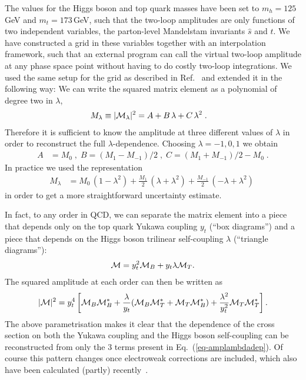 The values for the Higgs boson and top quark masses have been set to
$m_h=125$\,GeV and $m_t=173$\,GeV, such that the two-loop amplitudes
are only functions of two independent variables, the parton-level Mandelstam invariants
$\hat{s}$ and $\hat{t}$.  We have constructed a grid in these
variables together with an interpolation framework, such that an
external program can call the virtual two-loop amplitude at any phase space
point without having to do costly two-loop integrations.
We used the same setup for the grid as described in Ref.~\cite{Heinrich:2017kxx} and extended it in the following way:
We can write the squared matrix element as a polynomial of degree two in $\lambda$, 
\begin{align}
M_\lambda& \equiv |{\cal M}_\lambda|^2=A+B\,\lambda + C\,\lambda^2\;. \label{eq-amplambdadep}
\end{align}
Therefore it is sufficient to know the amplitude at three different values of $\lambda$ in order to reconstruct the full $\lambda$-dependence. 
Choosing $\lambda=-1,0,1$ we obtain
\begin{align}
A&=M_0\;,\; B=(M_1-M_{-1})/2\;,\; C=(M_1+M_{-1})/2-M_0\;.
\end{align}
In practice we used the representation 
\begin{align}
M_\lambda &=M_0\,(1-\lambda^2)+\frac{M_1}{2}\,(\lambda+\lambda^2) + \frac{M_{-1}}{2}\,(-\lambda+\lambda^2)\;
\end{align}
in order to get a more straightforward uncertainty estimate.

In fact, to any order in QCD,  we can separate the matrix element into a 
piece that depends only on the top quark Yukawa coupling $y_t$ (``box diagrams'') and a 
piece that depends on the Higgs boson trilinear self-coupling $\lambda$ (``triangle diagrams''):
\begin{align}
{\cal M} = y_t^2 {\cal M}_B + y_t \lambda {\cal M}_T.
\end{align}
The squared amplitude at each order can then be written as
\begin{align}
|{\cal M}|^2 = y_t^4 \left[ {\cal M}_B {\cal M}_B^* + \frac{\lambda}{y_t} ({\cal M}_B {\cal M}_T^* + {\cal M}_T {\cal M}_B^* ) +  \frac{\lambda^2}{y_t^2} {\cal M}_T {\cal M}_T^*  \right].\label{eq:yt}
\end{align}
The above parametrisation makes it clear that the dependence of the cross section on
both the Yukawa coupling and the Higgs boson self-coupling can be reconstructed
from only the 3 terms present in Eq.~(\ref{eq-amplambdadep}).
Of course this pattern changes once electroweak corrections are
included, which also have been calculated (partly) recently~\cite{Bizon:2018syu,Borowka:2018pxx}. 


